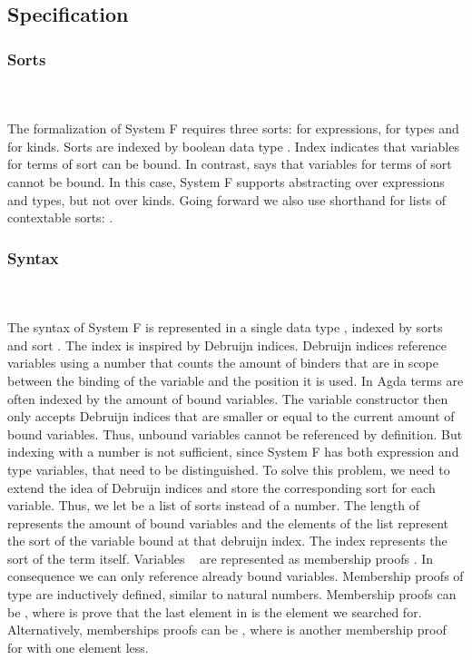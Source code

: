 \subsection{Specification}
\subsubsection{Sorts}\hfill\\\\
The formalization of System F requires three sorts:  for expressions,  for types and  for kinds. 
\FSort
Sorts are indexed by boolean data type . 
Index  indicates that variables for terms of sort  can be bound. 
In contrast,  says that variables for terms of sort  cannot be bound. 
In this case, System F supports abstracting over expressions and types, but not over kinds. 
Going forward we also use shorthand  for lists of contextable sorts: \FSorts.

\subsubsection{Syntax}\hfill\\\\
The syntax of System F is represented in a single data type , indexed by sorts  and sort . 
The index  is inspired by Debruijn indices. Debruijn indices reference variables using a number that counts the amount of binders that are in scope between the binding of the variable and the position it is used.
In Agda terms are often indexed by the amount of bound variables. The variable constructor then only accepts Debruijn indices that are smaller or equal to the current amount of bound variables. 
Thus, unbound variables cannot be referenced by definition.
But indexing  with a number is not sufficient, since System F has both expression and type variables, that need to be distinguished. 
To solve this problem, we need to extend the idea of Debruijn indices and store the corresponding sort for each variable. Thus, we let  be a list of sorts instead of a number.
The length of  represents the amount of bound variables and the elements  of the list represent the sort of the variable bound at that debruijn index. 
The index  represents the sort of the term itself.
\FTerm
Variables \  are represented as membership proofs   . In consequence we can only reference already bound variables.
Membership proofs of type    are inductively defined, similar to natural numbers. 
Membership proofs can be , where  is prove that the last element in  is the element we searched for. Alternatively, memberships proofs can be  , where  is another membership proof for  with one element less. 

